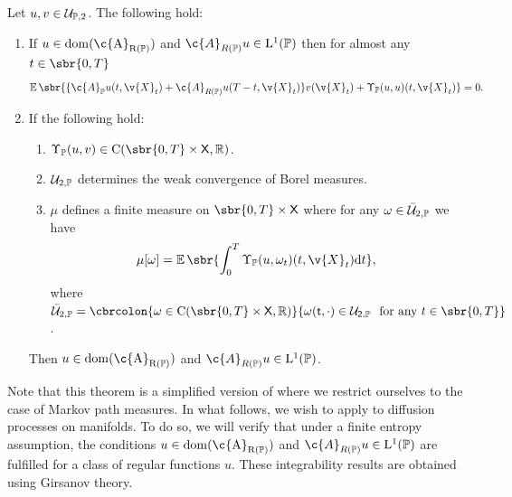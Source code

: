 \begin{theorem}
	\label{thm:ibp_cattiaux}
	Let \(u, v \in \mathcal{U}_{\bb{P}, 2}\).
	The following hold: \begin{enumerate}[label= (\alph*), wide, labelindent=0pt] \item If \(u \in \rm{dom}(\c{A}_{R(\bb{P})})\) and \(\c{A}_{R(\bb{P})}u \in \mathrm{L}^1(\bb{P})\) then for almost any \(t \in \sbr{0,T}\) \begin{equation} \E\sbr{\{\c{A}_{\bb{P}} u(t, \v{X}_t) + \c{A}_{R(\bb{P})} u (T-t, \v{X}_t)\}v(\v{X}_t) + \carrechamp_{\bb{P}}(u,u)(t, \v{X}_t)} = 0 .
		      \end{equation}
		\item If the following hold:
		      \begin{enumerate}[label=\roman*)]
			      \item \(\carrechamp_{\bb{P}}(u,v) \in \mathrm{C}(\sbr{0,T} \times \sf{X}, \R)\).
			      \item \(\mathcal{U}_{2, \bb{P}}\) determines the weak convergence of Borel measures.
			      \item \(\mu\) defines a finite measure on \(\sbr{0,T} \times \sf{X}\) where for
			            any \(\omega \in \bar{\mathcal{U}}_{2, \bb{P}}\) we have
			            \begin{equation}
				            {\mu[\omega] = \E\sbr{\int_0^T \carrechamp_{\bb{P}}(u,\omega_t)(t, \v{X}_t) \mathrm{d} t }},
			            \end{equation}
			            where
			            $\bar{\mathcal{U}}_{2, \bb{P}} = \cbrcolon{\omega \in \mathrm{C}(\sbr{0,T}
				            \times \sf{X}, \R)}{\omega(t, \cdot) \in \mathcal{U}_{2, \bb{P}}\ \
				            \text{for any \(t \in \sbr{0,T}\)}}$.
		      \end{enumerate}
		      Then \(u \in \rm{dom}(\c{A}_{R(\bb{P})})\) and \(\c{A}_{R(\bb{P})}u \in \mathrm{L}^1(\bb{P})\).
	\end{enumerate}
\end{theorem}

Note that this theorem is a simplified version of \textcite[Theorem 3.17]{cattiaux2021time} where we restrict ourselves to the case of Markov path measures.
In what follows, we wish to apply \Cref{thm:ibp_cattiaux} to diffusion processes on manifolds.
To do so, we will verify that under a finite entropy assumption, the conditions \(u \in \rm{dom}(\c{A}_{R(\bb{P})})\) and \(\c{A}_{R(\bb{P})}u \in \mathrm{L}^1(\bb{P})\) are fulfilled for a class of regular functions \(u\).
These integrability results are obtained using Girsanov theory.

